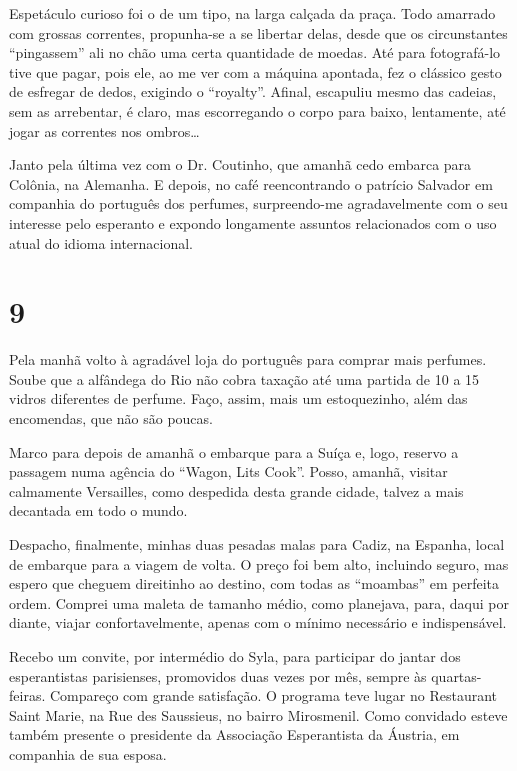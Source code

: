 Espetáculo curioso foi o de um tipo, na larga calçada da praça. Todo amarrado com grossas correntes, propunha-se a se libertar delas, desde que os circunstantes ``pingassem'' ali no chão uma certa quantidade de moedas. Até para fotografá-lo tive que pagar, pois ele, ao me ver com a máquina apontada, fez o clássico gesto de esfregar de dedos, exigindo o ``royalty''. Afinal, escapuliu mesmo das cadeias, sem as arrebentar, é claro, mas escorregando o corpo para baixo, lentamente, até jogar as correntes nos ombros\ldots

Janto pela última vez com o Dr. Coutinho, que amanhã cedo embarca para Colônia, na Alemanha. E depois, no café reencontrando o patrício Salvador em companhia do português dos perfumes, surpreendo-me agradavelmente com o seu interesse pelo esperanto e expondo longamente assuntos relacionados com o uso atual do idioma internacional.

\section*{9 \adfflatleafright {}}
Pela manhã volto à agradável loja do português para comprar mais perfumes. Soube que a alfândega do Rio não cobra taxação até uma partida de 10 a 15 vidros diferentes de perfume. Faço, assim, mais um estoquezinho, além das encomendas, que não são poucas.

Marco para depois de amanhã o embarque para a Suíça e, logo, reservo a passagem numa agência do ``Wagon, Lits Cook''. Posso, amanhã, visitar calmamente Versailles, como despedida desta grande cidade, talvez a mais decantada em todo o mundo.

Despacho, finalmente, minhas duas pesadas malas para Cadiz, na Espanha, local de embarque para a viagem de volta. O preço foi bem alto, incluindo seguro, mas espero que cheguem direitinho ao destino, com todas as ``moambas'' em perfeita ordem. Comprei uma maleta de tamanho médio, como planejava, para, daqui por diante, viajar confortavelmente, apenas com o mínimo necessário e indispensável.

Recebo um convite, por intermédio do Syla, para participar do jantar dos esperantistas parisienses, promovidos duas vezes por mês, sempre às quartas-feiras. Compareço com grande satisfação. O programa teve lugar no Restaurant Saint Marie, na Rue des Saussieus, no bairro Mirosmenil. Como convidado esteve também presente o presidente da Associação Esperantista da Áustria, em companhia de sua esposa.

